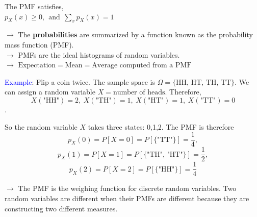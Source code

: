 \documentclass[letterpaper, 10.5pt,landscape]{article}
\begin{document}
\begin{multicols*}{3}
\vspace{-7pt}
The PMF satisfies,\\
\(p_{X}(x) \geq 0, \hspace{5pt} \text{and}  \hspace{5pt} \sum_{x} p_{X}(x) = 1\)


\vspace{3pt}


$\rightarrow$ The \textbf{probabilities} are summarized by a function known as the probability mass function (PMF). \\
$\rightarrow$ PMFs are the ideal histograms of random variables. \\

$\rightarrow$ \(\boxed{\text{Expectation} = \text{Mean} = \text{Average computed from a PMF}} \)

\vspace{5pt}
\textcolor{blue}{Example}: Flip a coin twice. The sample space is $\Omega = \{\text{HH, HT, TH, TT}\}$. We can assign a random variable $X =\text{number of heads}$. Therefore,
\vspace{-3pt}
\[X(\text{"HH"}) = 2, \hspace{3pt} X(\text{"TH"})=1, \hspace{3pt}
X(\text{"HT"})=1, \hspace{3pt}
X(\text{"TT"})=0 \].

\vspace{-7pt}

So the random variable $X$ takes three states: 0,1,2. The PMF is therefore
\vspace{-5pt}
\[p_{X}(0) = P[X=0] = P[\{\text{"TT"} \}] = \frac{1}{4}, \]
\vspace{-5pt}
\[p_{X}(1) = P[X=1] = P[\{\text{"TH", "HT"} \}] = \frac{1}{2}, \]
\vspace{-5pt}
\[p_{X}(2) = P[X=2] = P[\{\text{"HH"} \}] = \frac{1}{4} \]

$\rightarrow$ The PMF is the weighing function for discrete random variables. Two random variables are different when their PMFs are different because they are constructing two different measures.


\vspace{3pt}

\end{multicols*}
\end{document}
